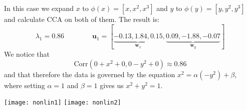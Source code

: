 \begin{example}
	In this case we expand $x$ to $\phi(x)=[x,x^2,x^3]$ and $y$ to $\phi(y)=[y,y^2,y^3]$ and calculate CCA on both of them. The result is:
	\begin{equation*}
		\lambda_1 = 0.86 \qquad\qquad \mathbf{u}_1 = [\underbrace{-0.13, 1.84, 0.15}_{\mathbf{w}_x}, \underbrace{0.09, -1.88, -0.07}_{\mathbf{w}_y}]
	\end{equation*}
	We notice that 
	\begin{equation*}
		\text{Corr}(0+ x^2+0, 0-y^2+0) \approx 0.86
	\end{equation*}
	and that therefore the data is governed by the equation $x^2 = \alpha(-y^2)+\beta$, where setting $\alpha=1$ and $\beta=1$ gives us $x^2+y^2=1$.
	\begin{center}
		\texttt{[image: nonlin1]}
		\texttt{[image: nonlin2]}
	\end{center}
\end{example}
